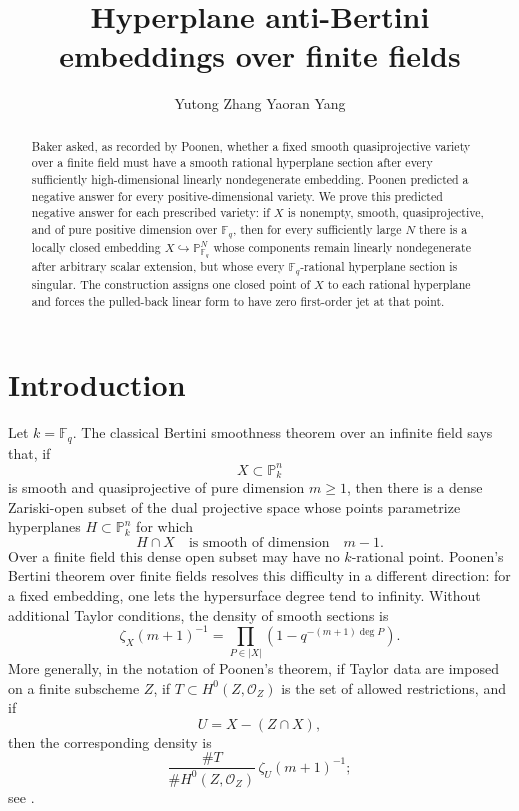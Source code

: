 \documentclass{lms}
\title[Anti-Bertini embeddings over finite fields]%
 {Hyperplane anti-Bertini embeddings over finite fields}
\author{Yutong Zhang     Yaoran Yang}
\newcommand{\F}{\mathbb F}
\newcommand{\PP}{\mathbb P}
\newcommand{\OO}{\mathcal O}
\begin{document}
\maketitle

\begin{abstract}
Baker asked, as recorded by Poonen, whether a fixed smooth quasiprojective variety over a finite field must have a smooth rational hyperplane section after every sufficiently high-dimensional linearly nondegenerate embedding.  Poonen predicted a negative answer for every positive-dimensional variety.  We prove this predicted negative answer for each prescribed variety: if $X$ is nonempty, smooth, quasiprojective, and of pure positive dimension over $\F_q$, then for every sufficiently large $N$ there is a locally closed embedding $X\hookrightarrow\PP^N_{\F_q}$ whose components remain linearly nondegenerate after arbitrary scalar extension, but whose every $\F_q$-rational hyperplane section is singular.  The construction assigns one closed point of $X$ to each rational hyperplane and forces the pulled-back linear form to have zero first-order jet at that point.
\end{abstract}

\begingroup
\makeatletter
\renewcommand\@pnumwidth{2em}
\renewcommand\@tocrmarg{3em}
\renewcommand\@dotsep{4.5}
\renewcommand*\l@section[2]{%
  \@dottedtocline{1}{0pt}{1.9em}{#1}{#2}%
}
\renewcommand*\l@subsection[2]{%
  \@dottedtocline{2}{1.9em}{2.8em}{#1}{#2}%
}
\makeatother
\setcounter{tocdepth}{2}
\tableofcontents
\endgroup

\section{Introduction}

Let $k=\F_q$.  The classical Bertini smoothness theorem over an infinite field says that, if
\[
        X\subset \PP^n_k
\]
is smooth and quasiprojective of pure dimension $m\ge1$, then there is a dense Zariski-open subset of the dual projective space whose points parametrize hyperplanes $H\subset\PP^n_k$ for which
\[
        H\cap X\quad\text{is smooth of dimension}\quad m-1.
\]
Over a finite field this dense open subset may have no $k$-rational point.  Poonen's Bertini theorem over finite fields resolves this difficulty in a different direction: for a fixed embedding, one lets the hypersurface degree tend to infinity.  Without additional Taylor conditions, the density of smooth sections is
\[
        \zeta_X(m+1)^{-1}
        =\prod_{P\in |X|}\left(1-q^{-(m+1)\deg P}\right).
\]
More generally, in the notation of Poonen's theorem, if Taylor data are imposed on a finite subscheme $Z$, if $T\subset H^0(Z,\OO_Z)$ is the set of allowed restrictions, and if
\[
        U=X-(Z\cap X),
\]
then the corresponding density is
\[
        \frac{\#T}{\#H^0(Z,\OO_Z)}\,\zeta_U(m+1)^{-1};
\]
see \cite[Theorems 1.1 and 1.2]{Poonen2004}.
\end{document}
